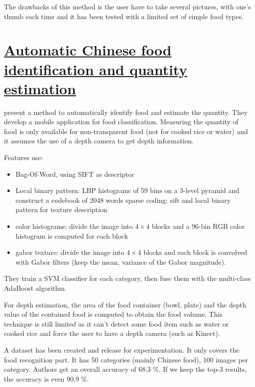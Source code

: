 The drawbacks of this method is the user have to take several pictures, with one's thumb each time and it has been tested with a limited set of simple food types.

\section{\href{http://dl.acm.org/citation.cfm?doid=2407746.2407775}{Automatic Chinese food identification and quantity estimation}}

\cite{Chen2012} present a method to automatically identify food and estimate the quantity. They develop a mobile application for food classification. Measuring the quantity of food is only available for non-transparent food (not for cooked rice or water) and it assumes the use of a depth camera to get depth information.

Features use:
\begin{itemize}
    \item Bag-Of-Word, using SIFT as descriptor
    \item Local binary pattern: LBP histograms of 59 bins on a 3-level pyramid and construct a codebook of 2048 words
    sparse coding: sift and local binary pattern for texture description
    \item color histograms: divide the image into $4 \times 4$ blocks and a 96-bin RGB color histogram is computed for each block
    \item gabor texture: divide the image into $4 \times 4$ blocks and each block is convolved with Gabor filters (keep the mean, variance of the Gabor magnitude).
\end{itemize}

They train a SVM classifier for each category, then fuse them with the multi-class AdaBoost algorithm.

For depth estimation, the area of the food container (bowl, plate) and the depth value of the contained food is computed to obtain the food volume. This technique is still limited as it can't detect some food item such as water or cooked rice and force the user to have a depth camera (such as Kinect).

A dataset has been created and release for experimentation. It only covers the food recognition part. It has 50 categories (mainly Chinese food), 100 images per category. Authors get an overall accuracy of 68.3 \%. If we keep the top-3 results, the accuracy is even 90.9 \%.
